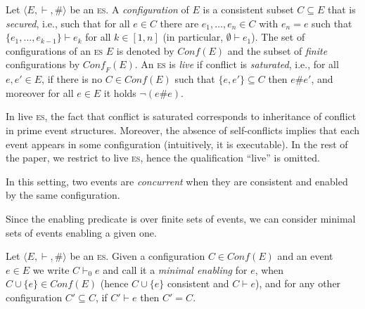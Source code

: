 \documentclass[conference]{IEEEtran}
\newcommand{\esabbr}{\textsc{es}}
\newcommand{\conf}[1]{\ensuremath{\mathit{Conf}({#1})}}
\newcommand{\conff}[1]{\ensuremath{\mathit{Conf_F}({#1})}}
\newcommand{\interval}[2][1]{\ensuremath{[{#1},{#2}]}}
\begin{document}
\begin{definition}
  Let $\langle E, \vdash, \# \rangle$ be an {\esabbr}. A
  \emph{configuration} of $E$ is a consistent subset $C \subseteq E$
  that is \emph{secured}, i.e., such that for all $e \in C$ there are
  $e_1, \ldots, e_n \in C$ with $e_n =e$ such that
  $\{ e_1, \ldots, e_{k-1} \} \vdash e_k$ for all $k \in \interval{n}$
  (in particular, $\emptyset \vdash e_1$). The set of configurations
  of an {\esabbr} $E$ is denoted by $\conf{E}$ and the subset of
  \emph{finite} configurations by $\conff{E}$.
  An {\esabbr} is \emph{live} if conflict is 
 \emph{saturated}, i.e., for all
  $e, e' \in E$, if there is no $C \in \conf{E}$ such that
  $\{e,e'\} \subseteq C$ then $e \# e'$, and moreover
  for all $e \in E$ it holds $\neg (e \# e)$.
\end{definition}

\begin{remark}
  In live {\esabbr}, the fact that conflict is saturated corresponds
  to inheritance of conflict in prime event structures. Moreover, the
  absence of self-conflicts implies that each event appears in some
  configuration (intuitively, it is executable). In the rest of the
  paper, we restrict to live {\esabbr}, hence the qualification
  ``live'' is omitted.
\end{remark}


In this setting, two events are \emph{concurrent} when they are consistent
and enabled by the same configuration.


Since the enabling predicate is over finite sets of events, we can
consider minimal sets of events enabling a given one.

\begin{definition}
  \label{de:minimimal-enabling}
  Let $\langle E, \vdash, \# \rangle$ be an {\esabbr}. Given a
  configuration $C \in \conf{{E}}$ and an event $e \in E$ we write
  $C \vdash_0 e$ and call it a \emph{minimal enabling} for $e$, when
  $C \cup \{ e \} \in \conf{E}$ (hence $C \cup \{ e \}$ consistent and
  $C \vdash e$), and for any other configuration $C' \subseteq C$, if
  $C' \vdash e$ then $C' = C$.
\end{definition}
\end{document}
